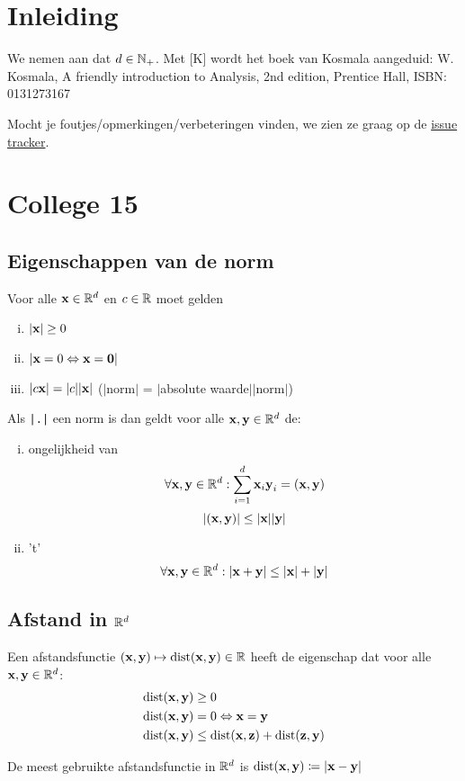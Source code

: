 \documentclass{2wa40summary}
\begin{document}
	\maketitle
	\thispagestyle{empty}
	\newpage
	
	\section{Inleiding}
	We nemen aan dat $d\in\mathbb{N}_+$. Met [K] wordt het boek van Kosmala aangeduid: W. Kosmala, A friendly introduction to Analysis, 2nd edition, Prentice Hall, ISBN: 0131273167
	
	Mocht je foutjes/opmerkingen/verbeteringen vinden, we zien ze graag op de \href{https://bitbucket.org/hollandpirates/analyse-2-samenvatting/issues?status=new&status=open}{issue tracker}.
	
	\section{College 15}
	\subsection{Eigenschappen van de norm}
	Voor alle ${\textbf{x}}\in \mathbb{R}^d$ en $c\in\mathbb{R}$ moet gelden
	\begin{enumerate}[(i)]
		\item $|{\textbf{x}}| \geq 0$
		\item ${\left|{\textbf{x}}=0 \Leftrightarrow {\textbf{x}}={\textbf{0}}\right|}$
		\item $|c{\textbf{x}}|=|c||{\textbf{x}}|$ ($|$norm$|$ = $|$absolute waarde$||$norm$|$)
	\end{enumerate}
	Als \verb#|.|# een norm is dan geldt voor alle ${\textbf{x}},{\textbf{y}}\in \mathbb{R}^d$ de:
	\begin{enumerate}[(i)]
		\item ongelijkheid van 
		\[\forall {\textbf{x}},{\textbf{y}} \in \mathbb{R}^d: \sum_{i=1}^{d}{\textbf{x}}_i {\textbf{y}}_i = ({\textbf{x}},{\textbf{y}})\]
		\[|({\textbf{x}},{\textbf{y}})| \leq |{\textbf{x}}||{\textbf{y}}|\]
		\item {} 't'
		\[\forall {\textbf{x}},{\textbf{y}} \in \mathbb{R}^d: |{\textbf{x}}+{\textbf{y}}|\leq |{\textbf{x}}|+|{\textbf{y}}|\]
	\end{enumerate}
	\subsection{Afstand in $\mathbb{R}^d$}
	\begin{define}
		Een afstandsfunctie $({\textbf{x}},{\textbf{y}})\mapsto\operatorname{\mathop{dist}}({\textbf{x}},{\textbf{y}})\in\mathbb{R}$ heeft de eigenschap dat voor alle ${\textbf{x}},{\textbf{y}}\in\mathbb{R}^d$:
		\begin{align*}
		\operatorname{\mathop{dist}}({\textbf{x}},{\textbf{y}}) & \geq 0 \\
		\operatorname{\mathop{dist}}({\textbf{x}},{\textbf{y}}) & =0 \Leftrightarrow {\textbf{x}}={\textbf{y}} \\
		\operatorname{\mathop{dist}}({\textbf{x}},{\textbf{y}}) & \leq \operatorname{\mathop{dist}}({\textbf{x}},{\textbf{z}}) + \operatorname{\mathop{dist}}({\textbf{z}},{\textbf{y}})
		\end{align*}
	\end{define}
	De meest gebruikte afstandsfunctie in $\mathbb{R}^d$ is $\operatorname{\mathop{dist}}({\textbf{x}},{\textbf{y}})\coloneqq |{\textbf{x}}-{\textbf{y}}|$
	
\end{document}
